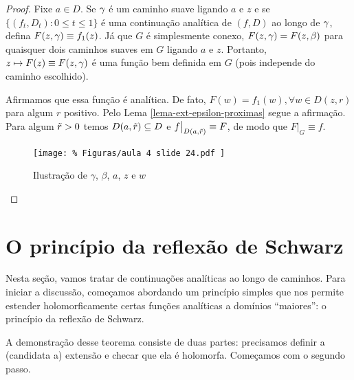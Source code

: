     \begin{proof}
        Fixe $a\in D$. Se $\gamma$ é um caminho suave ligando $a$ e $z$ e se 
        $\{ (f_t, D_t) : 0\leq t\leq 1 \}$ é uma continuação analítica de $(f,D)$ ao longo de
        $\gamma$, defina $F(z, \gamma) \equiv f_1(z)$. Já que $G$ é simplesmente conexo,
        $F(z, \gamma) = F(z,\beta)$ para quaisquer dois caminhos suaves em $G$ ligando $a$ e $z$.
        Portanto, $z\mapsto F(z)\equiv F(z, \gamma)$ é uma função bem definida em $G$ 
        (pois independe do caminho escolhido).
        
        Afirmamos que essa função é analítica. De fato, $F(w) = f_1(w), \forall w\in D(z,r)$
        para algum $r$ positivo. Pelo Lema \ref{lema-ext-epsilon-proximas} segue a afirmação.
        Para algum $\Tilde{r}>0$ temos $D(a, \Tilde{r}) \subseteq D$ e 
        $f\big|_{D(a, \Tilde{r})} \equiv F$, de modo que $F\big|_G \equiv f$.
        \begin{figure}[H]\centering
            \texttt{[image: \%
                Figuras/aula 4 slide 24.pdf
            ]}
            \caption{%
                Ilustração de $\gamma$, $\beta$, $a$, $z$ e $w$
            }
        \end{figure}
    \end{proof}
    
\section{O princípio da reflexão de Schwarz} %
\label{sec:Schwarz} %
    Nesta seção, vamos tratar de continuações analíticas ao longo de caminhos.
    Para iniciar a discussão, começamos abordando um princípio simples que nos permite
    estender holomorficamente certas funções analíticas a domínios ``maiores'': 
    o princípio da reflexão de Schwarz.
    
    A demonstração desse teorema consiste de duas partes: precisamos definir a 
    (candidata a) extensão e checar que ela é holomorfa. Começamos com o segundo passo.
    
